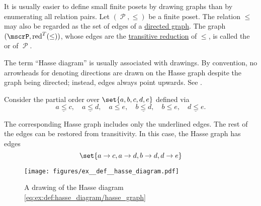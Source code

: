 \begin{definition}\label{def:hasse_diagram}
  It is usually easier to define small finite posets by drawing graphs than by enumerating all relation pairs. Let \( (\mscrP, \leq) \) be a finite poset. The relation \( \leq \) may also be regarded as the set of edges of a \hyperref[def:directed_graph]{directed graph}. The graph \( (\mscrP, \red^T(\leq)) \), whose edges are the \hyperref[def:derived_relations/transitive]{transitive reduction} of \( \leq \), is called the  or  of \( \mscrP \).

  The term \enquote{Hasse diagram} is usually associated with drawings. By convention, no arrowheads for denoting directions are drawn on the Hasse graph despite the graph being directed; instead, edges always point upwards. See .
\end{definition}

\begin{example}\label{ex:def:hasse_diagram}
  Consider the partial order over \( \set{ a, b, c, d, e } \) defined via
  \begin{equation}\label{eq:ex:def:hasse_diagram/poset}
    \underline{a \leq c},\quad \underline{a \leq d},\quad a \leq e,\quad \underline{b \leq d},\quad b \leq e,\quad \underline{d \leq e}.
  \end{equation}

  The corresponding Hasse graph includes only the underlined edges. The rest of the edges can be restored from transitivity. In this case, the Hasse graph has edges
  \begin{equation}\label{eq:ex:def:hasse_diagram/hasse_graph}
    \set{ a \to c, a \to d, b \to d, d \to e }
  \end{equation}

  \begin{figure}
    \centering
    \texttt{[image: figures/ex\_\_def\_\_hasse\_diagram.pdf]}
    \caption{A drawing of the Hasse diagram \eqref{eq:ex:def:hasse_diagram/hasse_graph}}
    \label{fig:ex:def:hasse_diagram}
  \end{figure}
\end{example}

